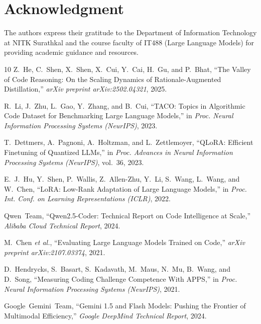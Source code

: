 \documentclass[journal]{IEEEtran}
\begin{document}
\section*{Acknowledgment}
The authors express their gratitude to the Department of Information Technology at NITK Surathkal and the course faculty of IT488 (Large Language Models) for providing academic guidance and resources.

\begin{thebibliography}{10}
Z.~He, C.~Shen, X.~Shen, X.~Cui, Y.~Cai, H.~Gu, and P.~Bhat,
``The Valley of Code Reasoning: On the Scaling Dynamics of Rationale-Augmented Distillation,''
\textit{arXiv preprint arXiv:2502.04321}, 2025.

R.~Li, J.~Zhu, L.~Gao, Y.~Zhang, and B.~Cui,
``TACO: Topics in Algorithmic Code Dataset for Benchmarking Large Language Models,''
in \textit{Proc. Neural Information Processing Systems (NeurIPS)}, 2023.

T.~Dettmers, A.~Pagnoni, A.~Holtzman, and L.~Zettlemoyer,
``QLoRA: Efficient Finetuning of Quantized LLMs,''
in \textit{Proc. Advances in Neural Information Processing Systems (NeurIPS)}, vol.~36, 2023.

E.~J.~Hu, Y.~Shen, P.~Wallis, Z.~Allen-Zhu, Y.~Li, S.~Wang, L.~Wang, and W.~Chen,
``LoRA: Low-Rank Adaptation of Large Language Models,''
in \textit{Proc. Int. Conf. on Learning Representations (ICLR)}, 2022.

Qwen~Team,
``Qwen2.5-Coder: Technical Report on Code Intelligence at Scale,''
\textit{Alibaba Cloud Technical Report}, 2024.

M.~Chen \textit{et al.},
``Evaluating Large Language Models Trained on Code,''
\textit{arXiv preprint arXiv:2107.03374}, 2021.

D.~Hendrycks, S.~Basart, S.~Kadavath, M.~Maus, N.~Mu, B.~Wang, and D.~Song,
``Measuring Coding Challenge Competence With APPS,''
in \textit{Proc. Neural Information Processing Systems (NeurIPS)}, 2021.

Google~Gemini~Team,
``Gemini 1.5 and Flash Models: Pushing the Frontier of Multimodal Efficiency,''
\textit{Google DeepMind Technical Report}, 2024.

\end{thebibliography}
\end{document}
